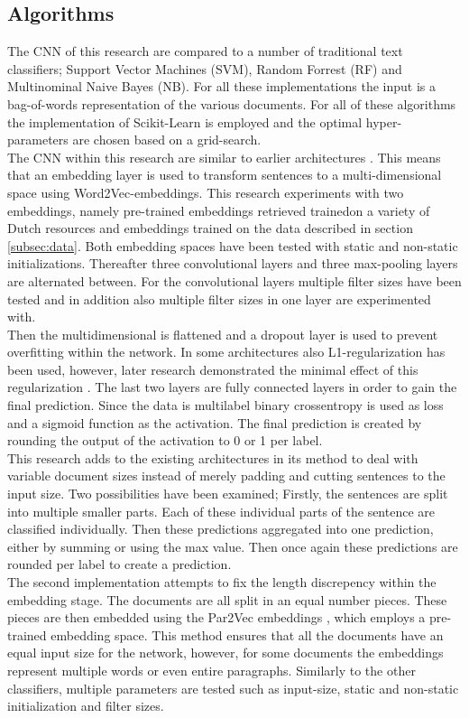 \subsection{Algorithms}
The CNN of this research are compared to a number of traditional text classifiers; Support Vector Machines (SVM), Random Forrest (RF) and Multinominal Naive Bayes (NB). For all these implementations the input is a bag-of-words representation of the various documents. For all of these algorithms the implementation of Scikit-Learn is employed and the optimal hyper-parameters are chosen based on a grid-search.\\
The CNN within this research are similar to earlier architectures \cite{kim2014convolutional}. This means that an embedding layer is used to transform sentences to a multi-dimensional space using Word2Vec-embeddings. This research experiments with two embeddings, namely pre-trained embeddings retrieved trainedon a variety of Dutch resources \cite{tulkens2016evaluating} and embeddings trained on the data described in section \ref{subsec:data}. Both embedding spaces have been tested with static and non-static initializations. Thereafter three convolutional layers and three max-pooling layers are alternated between. For the convolutional layers multiple filter sizes have been tested and in addition also multiple filter sizes in one layer are experimented with.\\
Then the multidimensional is flattened and a dropout layer is used to prevent overfitting within the network. In some architectures also L1-regularization has been used, however, later research demonstrated the minimal effect of this regularization \cite{zhang2015sensitivity}. The last two layers are fully connected layers in order to gain the final prediction. Since the data is multilabel binary crossentropy is used as loss and a sigmoid function as the activation. The final prediction is created by rounding the output of the activation to 0 or 1 per label. \\
This research adds to the existing architectures in its method to deal with variable document sizes instead of merely padding and cutting sentences to the input size. Two possibilities have been examined; Firstly, the sentences are split into multiple smaller parts. Each of these individual parts of the sentence are classified individually. Then these predictions aggregated into one prediction, either by summing or using the max value. Then once again these predictions are rounded per label to create a prediction.\\
The second implementation attempts to fix the length discrepency within the embedding stage. The documents are all split in an equal number pieces. These pieces are then embedded using the Par2Vec embeddings \cite{le2014distributed}, which employs a pre-trained embedding space. This method ensures that all the documents have an equal input size for the network, however, for some documents the embeddings represent multiple words or even entire paragraphs. Similarly to the other classifiers, multiple parameters are tested such as input-size, static and non-static initialization and filter sizes. \\ 

